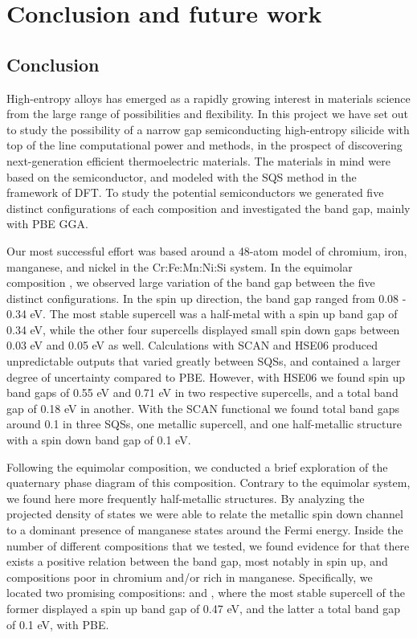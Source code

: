 \documentclass[UKenglish]{ifimaster}  %
\begin{document}
\part{Conclusion and future work}
\chapter{Conclusion}

High-entropy alloys has emerged as a rapidly growing interest in materials science from the large range of possibilities and flexibility. In this project we have set out to study the possibility of a narrow gap semiconducting high-entropy silicide with top of the line computational power and methods, in the prospect of discovering next-generation efficient thermoelectric materials. The materials in mind were based on the  semiconductor, and modeled with the SQS method in the framework of DFT. To study the potential semiconductors we generated five distinct configurations of each composition and investigated the band gap, mainly with PBE GGA.  

Our most successful effort was based around a 48-atom model of chromium, iron, manganese, and nickel in the Cr:Fe:Mn:Ni:Si system. In the equimolar composition , we observed large variation of the band gap between the five distinct configurations. In the spin up direction, the band gap ranged from 0.08 - 0.34 eV. The most stable supercell was a half-metal with a spin up band gap of 0.34 eV, while the other four supercells displayed small spin down gaps between 0.03 eV and 0.05 eV as well. Calculations with SCAN and HSE06 produced unpredictable outputs that varied greatly between SQSs, and contained a larger degree of uncertainty compared to PBE. However, with HSE06 we found spin up band gaps of 0.55 eV and 0.71 eV in two respective supercells, and a total band gap of 0.18 eV in another. With the SCAN functional we found total band gaps around 0.1 in three SQSs, one metallic supercell, and one half-metallic structure with a spin down band gap of 0.1 eV.   

Following the equimolar composition, we conducted a brief exploration of the quaternary phase diagram of this composition. Contrary to the equimolar system, we found here more frequently half-metallic structures. By analyzing the projected density of states we were able to relate the metallic spin down channel to a dominant presence of manganese states around the Fermi energy.  Inside the number of different compositions that we tested, we found evidence for that there exists a positive relation between the band gap, most notably in spin up, and compositions poor in chromium and/or rich in manganese. Specifically, we located two promising compositions:  and , where the most stable supercell of the former displayed a spin up band gap of 0.47 eV, and the latter a total band gap of 0.1 eV, with PBE.
\end{document}

